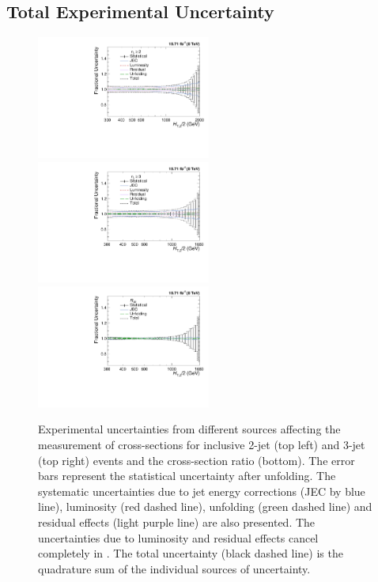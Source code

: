 \subsection{Total Experimental Uncertainty}
\begin{figure}[!h]
 \begin{center}
 \hspace*{-3mm}\includegraphics[width=0.51\textwidth]{Plots_HT_2_150/Total_unc_all_2_NLO_add.pdf}%
 ~~\includegraphics[width=0.51\textwidth]{Plots_HT_2_150/Total_unc_all_3_NLO_add.pdf}\\
 \includegraphics[width=0.51\textwidth]{Plots_HT_2_150/Total_Unc_ratio_32_direct_add.pdf}
 \caption[Experimental uncertainties from different sources affecting the measurement of cross-sections and the cross-section ratio.]{Experimental uncertainties from different sources affecting the measurement of cross-sections for inclusive 2-jet (top left) and 3-jet (top right) events and the cross-section ratio \ratio (bottom). The error bars represent the statistical uncertainty after unfolding. The systematic uncertainties due to jet energy corrections (JEC by blue line), luminosity (red dashed line), unfolding (green dashed line) and residual effects (light purple line) are also presented. The uncertainties due to luminosity and residual effects cancel completely in \ratio. The total uncertainty (black dashed line) is the quadrature sum of the individual sources of uncertainty.}
 \label{fig:exp_unc}
 \end{center}
\end{figure}
